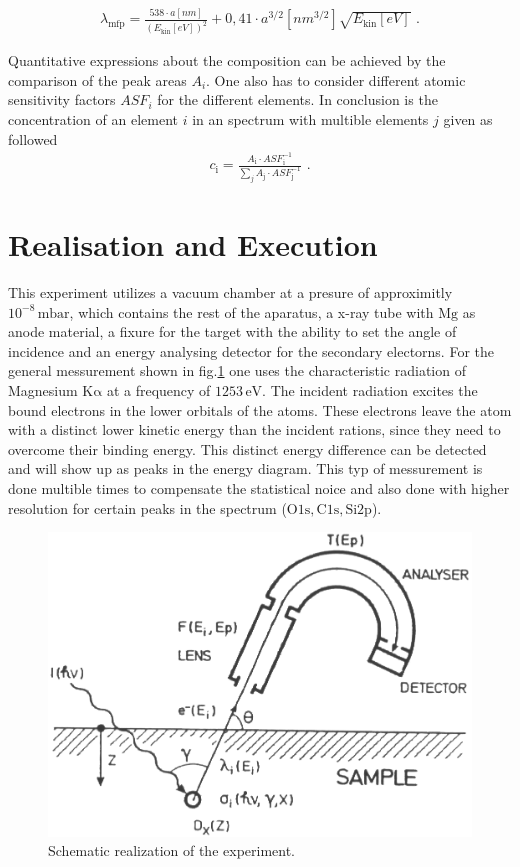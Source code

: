 \documentclass[numbers=noenddot,a4paper]{article}
\newcommand{\ix}[1]{_\text{#1}}
\begin{document}
				\begin{align}
				\lambda\ix{mfp}=\frac{538\cdot a\unit{[nm]}}{(E\ix{kin}\unit{[eV]})^2}+0,41\cdot a^{3/2}\unit{[nm^{3/2}]}\sqrt{E\ix{kin}\unit{[eV]}} \,\,.\label{eq:mfp}
				\end{align}

Quantitative expressions about the composition can be achieved by the comparison of the peak areas $A_i$. One also has to consider different atomic sensitivity factors $ASF_i$ for the different elements.
In conclusion is the concentration of an element $i$ in an spectrum with multible elements $j$ given as followed
	\begin{align}
	c\ix{i}=\frac{A\ix{i}\cdot ASF\ix{i}^{-1}}{\sum_{j}A\ix{j}\cdot ASF\ix{j}^{-1}} \,\,.
	\label{eq:conc}
	\end{align}

	\clearpage
	\section{Realisation and Execution}

This experiment utilizes a vacuum chamber at a presure of approximitly \\ $10^{-8}\,\mathrm{mbar}$, which contains the rest of the aparatus, a x-ray tube with $\mathrm{Mg}$ as anode material, a fixure for the target with the ability to set the angle of incidence and an energy analysing detector for the secondary electorns. For the general messurement shown in fig.\ref{fig:aufbau} one uses the characteristic radiation of Magnesium $\mathrm{K\alpha}$ at a frequency of $1253\,\mathrm{eV}$. The incident radiation excites the bound electrons in the lower orbitals of the atoms. These electrons leave the atom with a distinct lower kinetic energy than the incident rations, since they need to overcome their binding energy. This distinct energy difference can be detected and will show up as peaks in the energy diagram. This typ of messurement is done multible times to compensate the statistical noice and also done with higher resolution for certain peaks in the spectrum ($\mathrm{O 1s, C 1s, Si 2p}$).

\begin{figure}[h]
	\centering
	\includegraphics[width = 0.8 \columnwidth]{pics/aufbau.png}
	\caption{Schematic realization of the experiment.}
	\label{fig:aufbau}
\end{figure}
\end{document}
